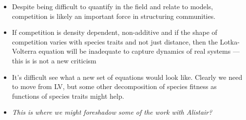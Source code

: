 \documentclass[a4paper,11pt]{article}
\begin{document}
\begin{itemize}
\item Despite being difficult to quantify in the field and relate to
  models, competition is likely an important force in structuring
  communities.
\item If competition is density dependent, non-additive and if the
  shape of competition varies with species traits and not just
  distance, then the Lotka-Volterra equation will be inadequate to
  capture dynamics of real systems --- this is is not a new criticism
  \citep[e.g., see][: ``The nearly complete dependence of theoretical
  community ecology on a limited number of simple
  models'']{Neill-1974}
\item It's difficult see what a new set of equations would look like.
  Clearly we need to move from LV, but some other decomposition of
  species fitness as functions of species traits might help.
\item \textit{This is where we might foreshadow some of the work with
    Alistair?}
\end{itemize}
\end{document}
